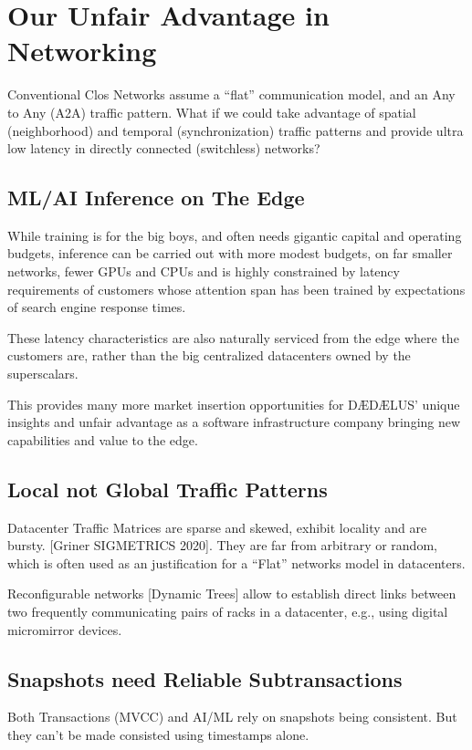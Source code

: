 \section{Our Unfair Advantage in Networking}

Conventional Clos Networks assume a “flat” communication model, and an Any to Any (A2A) traffic pattern.  What if we could take advantage of spatial (neighborhood) and temporal (synchronization) traffic patterns and provide ultra low latency in directly connected (switchless) networks?

\subsection{ML/AI Inference on The Edge}

While training is for the big boys, and often needs gigantic capital and operating budgets, inference can be carried out with more modest budgets, on far smaller networks, fewer GPUs and CPUs and is highly constrained by latency requirements of customers whose attention span has been trained by expectations of search engine response times.

These latency characteristics are also naturally serviced from the edge where the customers are, rather than the big centralized datacenters owned by the superscalars.

This provides many more market insertion opportunities for DÆDÆLUS’ unique insights and unfair advantage as a software infrastructure company bringing new capabilities and value to the edge. 

\subsection{Local not Global Traffic Patterns}
Datacenter Traffic Matrices are sparse and skewed, exhibit locality and are bursty. [Griner SIGMETRICS 2020]. They are far from arbitrary or random, which is often used as an justification for a “Flat” networks model in datacenters.

Reconfigurable networks [Dynamic Trees]  allow to establish direct links between two frequently communicating pairs of racks in a datacenter, e.g., using digital micromirror devices.

\subsection{Snapshots need Reliable Subtransactions}
Both Transactions (MVCC) and AI/ML rely on snapshots being consistent. But they can’t be made consisted using timestamps alone.

